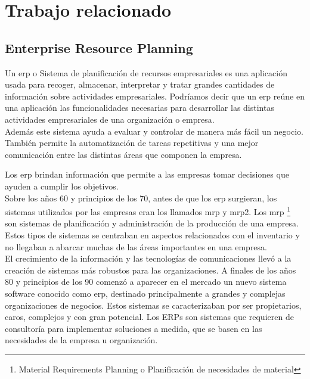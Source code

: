 \chapter{Trabajo relacionado}


\section[Enterprise Resource Planning]{Enterprise Resource Planning}

Un \acrfull{erp} o Sistema de planificación de recursos empresariales es una aplicación usada para recoger, almacenar,
interpretar y tratar grandes cantidades de información sobre actividades empresariales.
Podríamos decir que un \acrshort{erp} reúne en una aplicación las funcionalidades necesarias para desarrollar las distintas actividades empresariales de una organización o empresa.\\

Además este sistema ayuda a evaluar y controlar de manera más fácil un negocio. También permite la automatización de tareas repetitivas y una mejor comunicación entre las distintas áreas que componen la empresa.

Los \acrshort{erp} brindan información que permite a las empresas tomar decisiones que ayuden a cumplir los objetivos.\\

Sobre los años 60 y principios de los 70, antes de que los \acrshort{erp} surgieran, los sistemas utilizados por las empresas eran los llamados \acrshort{mrp} y \acrshort{mrp2}.
Los \acrshort{mrp} \footnote{Material Requirements Planning o Planificación de necesidades de material} son sistemas de planificación y administración de la producción de una empresa. Estos tipos de sistemas se centraban en aspectos relacionados con el inventario y no llegaban a abarcar muchas de las áreas importantes en una empresa.\\



El crecimiento de la información y las tecnologías de comunicaciones llevó a la creación de sistemas más robustos para 
las organizaciones. A finales de los años 80 y principios de los 90 comenzó a aparecer en el mercado un nuevo sistema 
software conocido como \acrshort{erp}, destinado principalmente a grandes y complejas organizaciones de negocios. Estos sistemas 
se caracterizaban por ser propietarios, caros, complejos y con gran potencial.
Los ERPs son sistemas que requieren de consultoría para implementar soluciones a medida, que se basen en las necesidades de la empresa u organización. \cite{hossain_rashid_patrick_2003}

